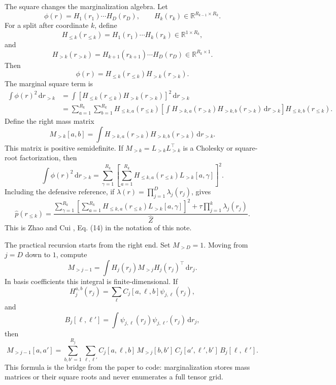\documentclass[11pt]{article}
\numberwithin{equation}{section}
\newcommand{\R}{\mathbb R}
\newcommand{\dd}{\,\mathrm d}
\begin{document}
The square changes the marginalization algebra.  Let
\[
    \phi(r)=H_1(r_1)\cdots H_D(r_D),
    \qquad H_k(r_k)\in\R^{R_{k-1}\times R_k}.
\]
For a split after coordinate \(k\), define
\[
    H_{\le k}(r_{\le k})=H_1(r_1)\cdots H_k(r_k)\in\R^{1\times R_k},
\]
and
\[
    H_{>k}(r_{>k})=H_{k+1}(r_{k+1})\cdots H_D(r_D)\in\R^{R_k\times 1}.
\]
Then
\[
    \phi(r)=H_{\le k}(r_{\le k})H_{>k}(r_{>k}).
\]
The marginal square term is
\begin{equation}
\begin{aligned}
 \int \phi(r)^2\dd r_{>k}
 &=
 \int
 \left[
 H_{\le k}(r_{\le k})H_{>k}(r_{>k})
 \right]^2\dd r_{>k}\\
 &=
 \sum_{a=1}^{R_k}\sum_{b=1}^{R_k}
 H_{\le k,a}(r_{\le k})
 \left[
 \int H_{>k,a}(r_{>k})H_{>k,b}(r_{>k})\dd r_{>k}
 \right]
 H_{\le k,b}(r_{\le k}).
\end{aligned}
\label{eq:p24-m1}
\end{equation}
Define the right mass matrix
\begin{equation}
    M_{>k}[a,b]
    =
    \int H_{>k,a}(r_{>k})H_{>k,b}(r_{>k})\dd r_{>k}.
    \label{eq:p24-m2}
\end{equation}
This matrix is positive semidefinite.  If \(M_{>k}=L_{>k}L_{>k}^\top\) is a
Cholesky or square-root factorization, then
\begin{equation}
    \int \phi(r)^2\dd r_{>k}
    =
    \sum_{\gamma=1}^{R_k}
    \left[
    \sum_{a=1}^{R_k}H_{\le k,a}(r_{\le k})L_{>k}[a,\gamma]
    \right]^2.
    \label{eq:p24-m3}
\end{equation}
Including the defensive reference, if
\(\lambda(r)=\prod_{j=1}^D\lambda_j(r_j)\), gives
\begin{equation}
    \widehat p(r_{\le k})
    =
    \frac{
    \sum_{\gamma=1}^{R_k}
    \left[
    \sum_{a=1}^{R_k}H_{\le k,a}(r_{\le k})L_{>k}[a,\gamma]
    \right]^2
    +
    \tau\prod_{j=1}^k\lambda_j(r_j)}
    {\widehat Z}.
    \label{eq:p24-m4}
\end{equation}
This is Zhao and Cui \cite{zhao2024ttsequential}, Eq. (14) in the notation of this note.

The practical recursion starts from the right end.  Set \(M_{>D}=1\).  Moving
from \(j=D\) down to \(1\), compute
\begin{equation}
    M_{>j-1}
    =
    \int H_j(r_j)M_{>j}H_j(r_j)^\top\dd r_j.
    \label{eq:p24-m5}
\end{equation}
In basis coefficients this integral is finite-dimensional.  If
\[
    H_j^{a,b}(r_j)=\sum_{\ell}C_j[a,\ell,b]\psi_{j,\ell}(r_j),
\]
and
\[
    B_j[\ell,\ell']
    =
    \int \psi_{j,\ell}(r_j)\psi_{j,\ell'}(r_j)\dd r_j,
\]
then
\begin{equation}
    M_{>j-1}[a,a']
    =
    \sum_{b,b'=1}^{R_j}
    \sum_{\ell,\ell'}
    C_j[a,\ell,b]\,M_{>j}[b,b']\,C_j[a',\ell',b']\,B_j[\ell,\ell'].
    \label{eq:p24-m6}
\end{equation}
This formula is the bridge from the paper to code: marginalization stores mass
matrices or their square roots and never enumerates a full tensor grid.
\end{document}
